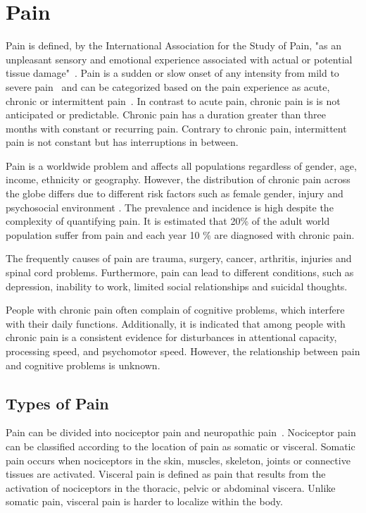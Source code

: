 \section{Pain} \label{sec:Pain}
Pain is defined, by the International Association for the Study of Pain, "as an unpleasant sensory and emotional experience associated with actual or potential tissue damage"~\cite{Kerstman2013}. 
Pain is a sudden or slow onset of any intensity from mild to severe pain~\cite{Mello2016} and can be categorized based on the pain experience as acute, chronic or intermittent pain~\cite{Goldberg2011}. In contrast to acute pain, chronic pain is is not anticipated or predictable. Chronic pain has a duration greater than three months with constant or recurring pain. Contrary to chronic pain, intermittent pain is not constant but has interruptions in between. \cite{Mello2016}

Pain is a worldwide problem and affects all populations regardless of gender, age, income, ethnicity or geography. However, the distribution of chronic pain across the globe differs due to different risk factors such as female gender, injury and psychosocial environment \cite{Macfarlanea2016}.  The prevalence and incidence is high despite the complexity of quantifying pain. It is estimated that 20\% of the adult world population suffer from pain and each year 10 \% are diagnosed with chronic pain. \cite{Goldberg2011}

The frequently causes of pain are trauma, surgery, cancer, arthritis, injuries and spinal cord problems. Furthermore, pain can lead to different conditions, such as depression, inability to work, limited social relationships and suicidal thoughts.~\cite{Breivik2006, Goldberg2011}

People with chronic pain often complain of cognitive problems, which interfere with their daily functions. Additionally, it is indicated that among people with chronic pain is a consistent evidence for disturbances in attentional capacity, processing speed, and psychomotor speed. However, the relationship between pain and cognitive problems is unknown.~\cite{Geisser2018}

\subsection{Types of Pain}
Pain can be divided into nociceptor pain and neuropathic pain~\cite{Steeds2013}. Nociceptor pain can be classified according to the location of pain as somatic or visceral. Somatic pain occurs when nociceptors in the skin, muscles, skeleton, joints or connective tissues are activated. Visceral pain is defined as pain that results from the activation of nociceptors in the thoracic, pelvic or abdominal viscera. Unlike somatic pain, visceral pain is harder to localize within the body. \cite{Kerstman2013} 

